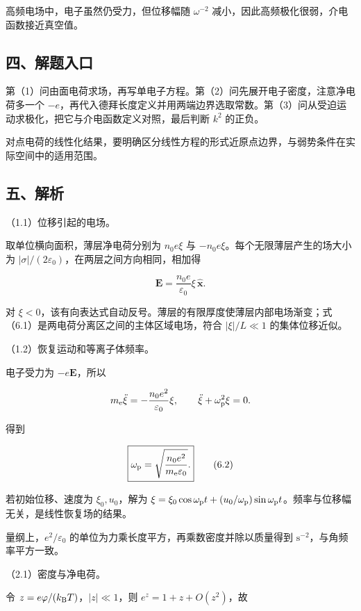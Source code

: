 \documentclass[12pt,a4paper,fontset=fandol]{ctexart}
\begin{document}
高频电场中，电子虽然仍受力，但位移幅随 \(\omega^{-2}\)
减小，因此高频极化很弱，介电函数接近真空值。

\subsection{四、解题入口}\label{ux56dbux89e3ux9898ux5165ux53e3-5}

第（1）问由面电荷求场，再写单电子方程。第（2）问先展开电子密度，注意净电荷多一个
\(-e\)，再代入德拜长度定义并用两端边界选取常数。第（3）问从受迫运动求极化，把它与介电函数定义对照，最后判断
\(k^2\) 的正负。

对点电荷的线性化结果，要明确区分线性方程的形式近原点边界，与弱势条件在实际空间中的适用范围。

\subsection{五、解析}\label{ux4e94ux89e3ux6790-5}

（1.1）位移引起的电场。

取单位横向面积，薄层净电荷分别为 \(n_0e\xi\) 与
\(-n_0e\xi\)。每个无限薄层产生的场大小为
\(|\sigma|/(2\varepsilon_0)\)，在两层之间方向相同，相加得

\[
\boxed{\boldsymbol E=\frac{n_0e}{\varepsilon_0}\xi\,\hat{\boldsymbol x}.}
\tag{6.1}
\]

对
\(\xi<0\)，该有向表达式自动反号。薄层的有限厚度使薄层内部电场渐变；式（6.1）是两电荷分离区之间的主体区域电场，符合
\(|\xi|/L\ll1\) 的集体位移近似。

（1.2）恢复运动和等离子体频率。

电子受力为 \(-e\boldsymbol E\)，所以

\[
m_{\rm e}\ddot\xi=-\frac{n_0e^2}{\varepsilon_0}\xi,
\qquad
\ddot\xi+\omega_{\rm p}^2\xi=0.
\]

得到

\[
\boxed{\omega_{\rm p}=\sqrt{\frac{n_0e^2}{m_{\rm e}\varepsilon_0}}.}
\tag{6.2}
\]

若初始位移、速度为 \(\xi_0,u_0\)，解为
\(\xi=\xi_0\cos\omega_{\rm p}t+(u_0/\omega_{\rm p})\sin\omega_{\rm p}t\)。频率与位移幅无关，是线性恢复场的结果。

量纲上，\(e^2/\varepsilon_0\)
的单位为力乘长度平方，再乘数密度并除以质量得到
\(\mathrm{s^{-2}}\)，与角频率平方一致。

（2.1）密度与净电荷。

令 \(z=e\varphi/(k_{\rm B}T)\)，\(|z|\ll1\)，则 \(e^z=1+z+O(z^2)\)，故
\end{document}
